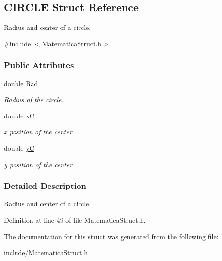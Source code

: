 \hypertarget{structCIRCLE}{}\subsection{C\+I\+R\+C\+LE Struct Reference}
\label{structCIRCLE}


Radius and center of a circle.  




{\ttfamily \#include $<$Matematica\+Struct.\+h$>$}

\subsubsection*{Public Attributes}
\begin{DoxyCompactItemize}
\item 
double \hyperlink{structCIRCLE_a860bef50013f57ab1a6437b7986a9487}{Rad}\hypertarget{structCIRCLE_a860bef50013f57ab1a6437b7986a9487}{}\label{structCIRCLE_a860bef50013f57ab1a6437b7986a9487}

\begin{DoxyCompactList}\small\item\em Radius of the circle. \end{DoxyCompactList}\item 
double \hyperlink{structCIRCLE_a948efd29e2703858b2752cdba79b89c2}{xC}\hypertarget{structCIRCLE_a948efd29e2703858b2752cdba79b89c2}{}\label{structCIRCLE_a948efd29e2703858b2752cdba79b89c2}

\begin{DoxyCompactList}\small\item\em x position of the center \end{DoxyCompactList}\item 
double \hyperlink{structCIRCLE_a7d873dd60d81fee341939655db765355}{yC}\hypertarget{structCIRCLE_a7d873dd60d81fee341939655db765355}{}\label{structCIRCLE_a7d873dd60d81fee341939655db765355}

\begin{DoxyCompactList}\small\item\em y position of the center \end{DoxyCompactList}\end{DoxyCompactItemize}


\subsubsection{Detailed Description}
Radius and center of a circle. 

Definition at line 49 of file Matematica\+Struct.\+h.



The documentation for this struct was generated from the following file\+:\begin{DoxyCompactItemize}
\item 
include/Matematica\+Struct.\+h\end{DoxyCompactItemize}
